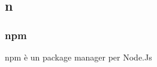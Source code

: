 \subsection*{\textbf{\hfill \Huge{n} \hfill}} 
\subsubsection*{npm}
npm è un package manager per Node.Js
